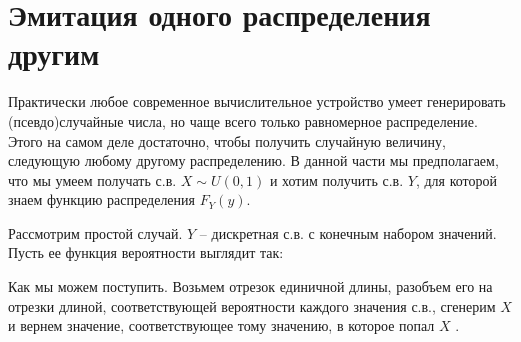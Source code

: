 \documentclass[12pt]{article}
\begin{document}
\section{Эмитация одного распределения другим}

Практически любое современное вычислительное устройство умеет генерировать (псевдо)случайные числа, но чаще всего только равномерное распределение. Этого на самом деле достаточно, чтобы получить случайную величину, следующую любому другому распределению. В данной части мы предполагаем, что мы умеем получать с.в. $X \sim U(0 ,1)$ и хотим получить с.в. $Y$, для которой знаем функцию распределения $F_Y(y)$.

Рассмотрим простой случай. $Y$ -- дискретная с.в. с конечным набором значений. Пусть ее функция вероятности выглядит так:

\begin{center}
\end{center}

Как мы можем поступить. Возьмем отрезок единичной длины, разобъем его на отрезки длиной, соответствующей вероятности каждого значения с.в., сгенерим $X$ и вернем значение, соответствующее тому значению, в которое попал $X$ .

\begin{center}
\end{center}
\end{document}
